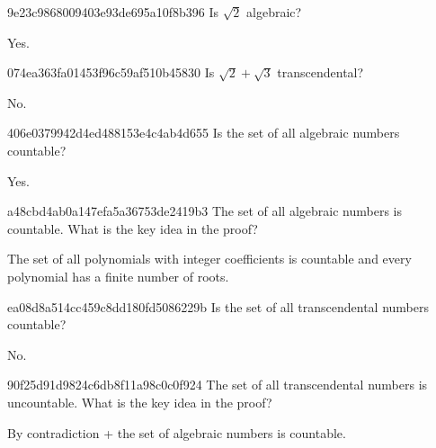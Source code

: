 \begin{note}{9e23c9868009403e93de695a10f8b396}
    Is \({ \sqrt{2} }\) algebraic?

    \begin{cloze}{1}
        Yes.
    \end{cloze}
\end{note}

\begin{note}{074ea363fa01453f96c59af510b45830}
    Is \({ \sqrt{2} + \sqrt{3} }\) transcendental?

    \begin{cloze}{1}
        No.
    \end{cloze}
\end{note}

\begin{note}{406e0379942d4ed488153e4c4ab4d655}
    Is the set of all algebraic numbers countable?

    \begin{cloze}{1}
        Yes.
    \end{cloze}
\end{note}

\begin{note}{a48cbd4ab0a147efa5a36753de2419b3}
    The set of all algebraic numbers is countable.
    What is the key idea in the proof?

    \begin{cloze}{1}
        The set of all polynomials with integer coefficients is countable and every polynomial has a finite number of roots.
    \end{cloze}
\end{note}

\begin{note}{ea08d8a514cc459c8dd180fd5086229b}
    Is the set of all transcendental numbers countable?

    \begin{cloze}{1}
        No.
    \end{cloze}
\end{note}

\begin{note}{90f25d91d9824c6db8f11a98c0c0f924}
    The set of all transcendental numbers is uncountable.
    What is the key idea in the proof?

    \begin{cloze}{1}
        By contradiction + the set of algebraic numbers is countable.
    \end{cloze}
\end{note}

